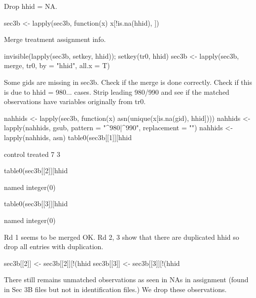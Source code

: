 Drop hhid = NA.
\begin{Schunk}
\begin{Sinput}
sec3b <- lapply(sec3b, function(x) x[!is.na(hhid), ])
\end{Sinput}
\end{Schunk}
Merge treatment assignment info.
\begin{Schunk}
\begin{Sinput}
invisible(lapply(sec3b, setkey, hhid)); setkey(tr0, hhid)
sec3b <- lapply(sec3b, merge, tr0, by = "hhid", all.x = T)
\end{Sinput}
\end{Schunk}
Some \textsf{gid}s are missing in sec3b. Check if the merge is done correctly. Check if this is due to hhid = 980... cases. Strip leading 980/990 and see if the matched observations have variables originally from \textsf{tr0}.
\begin{Schunk}
\begin{Sinput}
nahhids <- lapply(sec3b, function(x) asn(unique(x[is.na(gid), hhid])))
nahhids <- lapply(nahhids, gsub, pattern = "^980|^990", replacement = "")
nahhids <- lapply(nahhids, asn)
table0(sec3b[[1]][hhid %in% nahhids[[1]], assignment])
\end{Sinput}
\begin{Soutput}

control treated 
      7       3 
\end{Soutput}
\begin{Sinput}
table0(sec3b[[2]][hhid %in% nahhids[[2]], assignment])
\end{Sinput}
\begin{Soutput}
named integer(0)
\end{Soutput}
\begin{Sinput}
table0(sec3b[[3]][hhid %in% nahhids[[3]], assignment])
\end{Sinput}
\begin{Soutput}
named integer(0)
\end{Soutput}
\end{Schunk}
Rd 1 seems to be merged OK. Rd 2, 3 show that there are duplicated \textsf{hhid} so drop all entries with duplication.
\begin{Schunk}
\begin{Sinput}
sec3b[[2]] <- sec3b[[2]][!(hhid %in% nahhids[[2]]), ]
sec3b[[3]] <- sec3b[[3]][!(hhid %in% nahhids[[3]]), ]
\end{Sinput}
\end{Schunk}
There still remains unmatched observations as seen in NAs in \textsf{assignment} (found in Sec 3B files but not in identification files.) We drop these observations.
